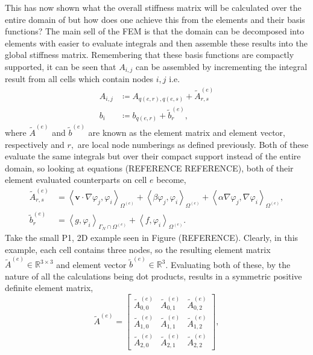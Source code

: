 This has now shown what the overall stiffness matrix will be calculated over the entire domain of but how does one achieve this from the elements and their basis functions? The main sell of the FEM is that the domain can be decomposed into elements with easier to evaluate integrals and then assemble these results into the global stiffness matrix. Remembering that these basis functions are compactly supported, it can be seen that $A_{i,j}$ can be assembled by incrementing the integral result from all cells which contain nodes $i,j$  i.e.
\begin{align}
	A_{i,j} &\coloneqq A_{q(e,r),q(e,s)} + \tilde{A}_{r,s}^{(e)}\\
	b_i &\coloneqq b_{q(e,r)} + \tilde{b}_r^{(e)},
\end{align}
where $\tilde{A}^{(e)}$ and $\tilde{b}^{(e)}$ are known as the element matrix and element vector, respectively and $r,$ are local node numberings as defined previously. Both of these evaluate the same integrals but over their compact support instead of the entire domain, so looking at equations (REFERENCE REFERENCE), both of their element evaluated counterparts on cell $e$ become,
\begin{align}
	\tilde{A}_{r,s}^{(e)} &= \left\langle\mathbf{v}\cdot\nabla \varphi_j,\varphi_i\right\rangle_{\Omega^{(e)}} + \left\langle\beta \varphi_j,\varphi_i\right\rangle_{\Omega^{(e)}} + \left\langle\alpha\nabla \varphi_j, \nabla \varphi_i\right\rangle_{\Omega^{(e)}}, \\
	\tilde{b}_r^{(e)} &= \left\langle g,\varphi_i\right\rangle_{\Gamma_N\cap\Omega^{(e)}} + \left\langle f,\varphi_i\right\rangle_{\Omega^{(e)}}.
\end{align}
Take the small P1, 2D example seen in Figure (REFERENCE). Clearly, in this example, each cell contains three nodes, so the resulting element matrix $\tilde{A}^{(e)} \in \mathbb{R}^{3\times 3}$ and element vector $\tilde{b}^{(e)} \in \mathbb{R}^3$. Evaluating both of these, by the nature of all the calculations being dot products, results in a symmetric positive definite element matrix,
\begin{equation}
	\tilde{A}^{(e)} =
	\left[\begin{matrix} 
		\tilde{A}^{(e)}_{0,0} & \tilde{A}^{(e)}_{0,1} & \tilde{A}^{(e)}_{0,2} \\
		\tilde{A}^{(e)}_{1,0} & \tilde{A}^{(e)}_{1,1} & \tilde{A}^{(e)}_{1,2} \\
		\tilde{A}^{(e)}_{2,0} & \tilde{A}^{(e)}_{2,1} & \tilde{A}^{(e)}_{2,2}
	\end{matrix}\right],
\end{equation}
